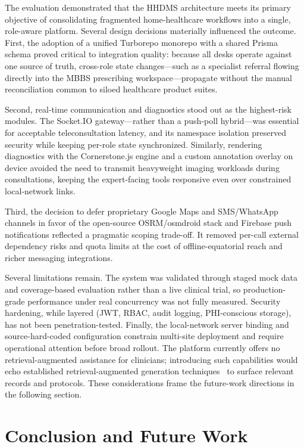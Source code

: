 \documentclass[conference]{IEEEtran}
\begin{document}
The evaluation demonstrated that the HHDMS architecture meets its primary objective of consolidating fragmented home-healthcare workflows into a single, role-aware platform. Several design decisions materially influenced the outcome. First, the adoption of a unified Turborepo monorepo with a shared Prisma schema proved critical to integration quality: because all desks operate against one source of truth, cross-role state changes---such as a specialist referral flowing directly into the MBBS prescribing workspace---propagate without the manual reconciliation common to siloed healthcare product suites.

Second, real-time communication and diagnostics stood out as the highest-risk modules. The Socket.IO gateway---rather than a push-poll hybrid---was essential for acceptable teleconsultation latency, and its namespace isolation preserved security while keeping per-role state synchronized. Similarly, rendering diagnostics with the Cornerstone.js engine and a custom annotation overlay on device avoided the need to transmit heavyweight imaging workloads during consultations, keeping the expert-facing tools responsive even over constrained local-network links.

Third, the decision to defer proprietary Google Maps and SMS/WhatsApp channels in favor of the open-source OSRM/osmdroid stack and Firebase push notifications reflected a pragmatic scoping trade-off. It removed per-call external dependency risks and quota limits at the cost of offline-equatorial reach and richer messaging integrations.

Several limitations remain. The system was validated through staged mock data and coverage-based evaluation rather than a live clinical trial, so production-grade performance under real concurrency was not fully measured. Security hardening, while layered (JWT, RBAC, audit logging, PHI-conscious storage), has not been penetration-tested. Finally, the local-network server binding and source-hard-coded configuration constrain multi-site deployment and require operational attention before broad rollout. The platform currently offers no retrieval-augmented assistance for clinicians; introducing such capabilities would echo established retrieval-augmented generation techniques~\cite{rag2020} to surface relevant records and protocols. These considerations frame the future-work directions in the following section.

\section{Conclusion and Future Work}
\end{document}
